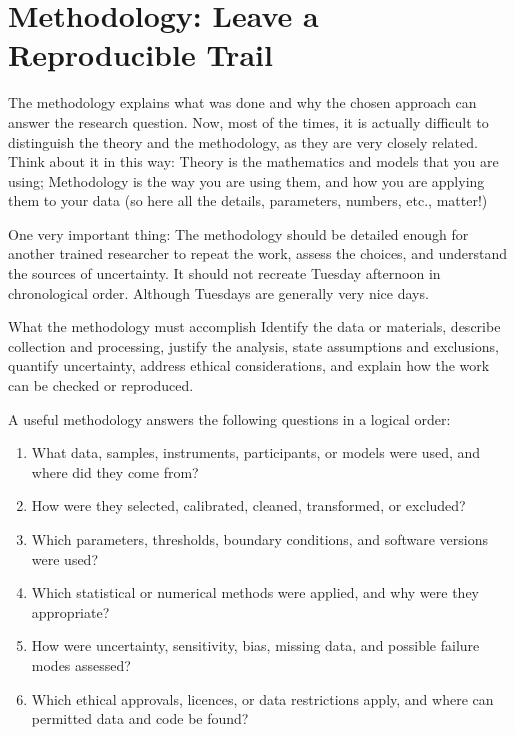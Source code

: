 \documentclass[masters,en,listoffigures,listoftables,acronyms]{NMBU}
\begin{document}
\clearpage
\section{Methodology: Leave a Reproducible Trail}
\label{sec:methods}

The methodology explains what was done and why the chosen approach can answer the research question.
Now, most of the times, it is actually difficult to distinguish the theory and the methodology, as they are very closely related.
Think about it in this way: Theory is the mathematics and models that you are using; Methodology is the way you are using them, and how you are applying them to your data (so here all the details, parameters, numbers, etc., matter!)

One very important thing: The methodology should be detailed enough for another trained researcher to repeat the work, assess the choices, and understand the sources of uncertainty.
It should not recreate Tuesday afternoon in chronological order.
Although Tuesdays are generally very nice days.

\begin{thesispoint}{What the methodology must accomplish}
Identify the data or materials, describe collection and processing, justify the analysis, state assumptions and exclusions, quantify uncertainty, address ethical considerations, and explain how the work can be checked or reproduced.
\end{thesispoint}

A useful methodology answers the following questions in a logical order:

\begin{enumerate}
  \item What data, samples, instruments, participants, or models were used, and
  where did they come from?
  \item How were they selected, calibrated, cleaned, transformed, or excluded?
  \item Which parameters, thresholds, boundary conditions, and software
  versions were used?
  \item Which statistical or numerical methods were applied, and why were they appropriate?
  \item How were uncertainty, sensitivity, bias, missing data, and possible
  failure modes assessed?
  \item Which ethical approvals, licences, or data restrictions apply, and
  where can permitted data and code be found?
\end{enumerate}
\end{document}
